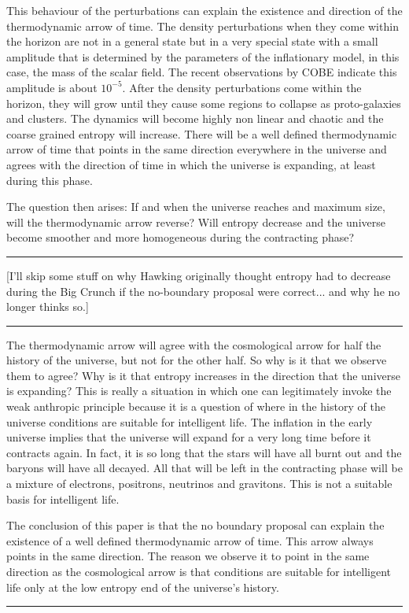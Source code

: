 This behaviour of the perturbations can explain the existence and direction
of the thermodynamic arrow of time. The density perturbations when they
come within the horizon are not in a general state but in a very special
state with a small amplitude that is determined by the parameters of the
inflationary model, in this case, the mass of the scalar field. The recent
observations by COBE indicate this amplitude is about $10^{-5}$. After the
density perturbations come within the horizon, they will grow until they
cause some regions to collapse as proto-galaxies and clusters. The
dynamics will become highly non linear and chaotic and the coarse grained
entropy will increase. There will be a well defined thermodynamic arrow of
time that points in the same direction everywhere in the universe and
agrees with the direction of time in which the universe is expanding, at
least during this phase.

The question then arises: If and when the universe reaches and maximum
size, will the thermodynamic arrow reverse? Will entropy decrease and the
universe become smoother and more homogeneous during the contracting
phase? 
\par\noindent\rule{\textwidth}{0.4pt}

[I'll skip some stuff on why Hawking originally thought entropy
had to decrease during the Big Crunch if the no-boundary proposal
were correct... and why he no longer thinks so.]

\par\noindent\rule{\textwidth}{0.4pt}
The thermodynamic arrow will agree with the cosmological arrow for half the
history of the universe, but not for the other half. So why is it that we
observe them to agree? Why is it that entropy increases in the direction
that the universe is expanding? This is really a situation in which one can
legitimately invoke the weak anthropic principle because it is a question
of where in the history of the universe conditions are suitable for
intelligent life. The inflation in the early universe implies that the
universe will expand for a very long time before it contracts again. In
fact, it is so long that the stars will have all burnt out and the baryons
will have all decayed. All that will be left in the contracting phase will
be a mixture of electrons, positrons, neutrinos and gravitons. This is not
a suitable basis for intelligent life.

The conclusion of this paper is that the no boundary proposal can explain
the existence of a well defined thermodynamic arrow of time. This arrow
always points in the same direction. The reason we observe it to point in
the same direction as the cosmological arrow is that conditions are
suitable for intelligent life only at the low entropy end of the
universe's history.
\par\noindent\rule{\textwidth}{0.4pt}
